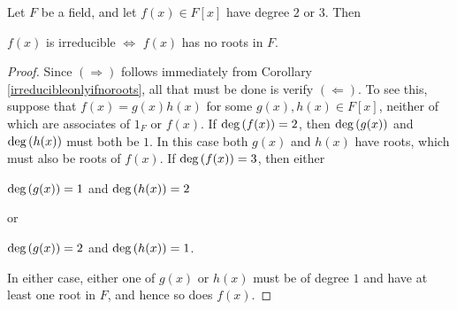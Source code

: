 \documentclass[11pt,fleqn,dvipsnames,usenames]{article}
\newcommand{\p}{\noindent}
\begin{document}
%
\begin{corollary}\label{irreducibleonlyifnorootspartialconverse}
Let $F$ be a field, and let $f(x)\in F[x]$ have degree $2$ or $3$.  Then
\begin{center}
$f(x)$ is irreducible $\Leftrightarrow$ $f(x)$ has no roots in $F$.
\end{center}
\end{corollary}
%
\begin{proof}
Since $(\Rightarrow)$  follows immediately from Corollary \ref{irreducibleonlyifnoroots}, all that must be done is verify $(\Leftarrow)$.  To see this, suppose that $f(x) = g(x)h(x)$ for some $g(x),h(x)\in F[x]$, neither of which are associates of $1_{F}$ or $f(x)$.  If $\text{deg}\left(f(x)\right) = 2$, then
$\text{deg}\left(g(x)\right)$ and $\text{deg}\left(h(x)\right)$ must both be $1$.  In this case both $g(x)$ and $h(x)$ have roots, which must also be roots of $f(x)$.  If $\text{deg}\left(f(x)\right) = 3$, then either
\begin{center}
$\text{deg}\left(g(x)\right) = 1$ and $\text{deg}\left(h(x)\right) = 2$
\end{center}
or
\begin{center}
$\text{deg}\left(g(x)\right) = 2$ and $\text{deg}\left(h(x)\right) = 1$.
\end{center}
\p In either case, either one of $g(x)$ or $h(x)$ must be of degree $1$ and have at least one root in $F$, and hence so does $f(x)$.
\end{proof}
%
\end{document}
